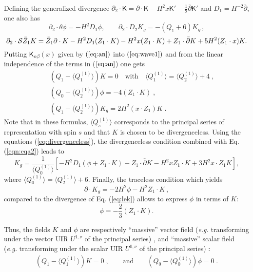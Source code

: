 \documentclass[a4paper,11pt,showpacs,preprintnumbers]{revtex4}
\def\K{\textsf{K}}
\begin{document}
Defining the generalized divergence $\partial_2\cdot \K=\partial
\cdot\K- H^2 x \K'-\frac{1}{2} \bar  \partial \K'$ and
$D_1=H^{-2}\bar \partial$, one also has
\begin{equation}
\partial_2 \cdot
\theta\phi=-H^2D_1\phi,\qquad\partial_2 \cdot D_2K_g =
-(Q_1+6)K_g\,,\nonumber
\end{equation}
\begin{equation}
\partial_2 \cdot {\cal S}\bar Z_1K=\bar Z_1
\partial \cdot K-H^2D_1(Z_{1}\cdot K)-H^2x(Z_{1}\cdot
K)+Z_{1}\cdot\bar\partial K+5H^2(Z_{1}\cdot x)
K.\label{eq:divergenceless}
\end{equation}
 Putting $\K_{\alpha\beta}(x)$ given by
$(\ref{eq:an})$ into $(\ref{eq:wave1})$ and from the linear
independence of the terms in ($\ref{eq:an}$) one gets
\begin{eqnarray}
&&\left(Q_{1}-\langle Q_1^{(1)}\rangle\right)K=0
\quad\mbox{with}\quad\langle Q_1^{(1)}\rangle= \langle Q_2^{(1)}\rangle+4\;,\label{eqn:eqa} \\
&&\left(Q_{0}-\langle Q_2^{(1)}\rangle \right)\phi =-4(Z_1 \cdot K)\;,\label{eqn:eqa1}\\
&&\left(Q_1 -\langle Q_2^{(1)}\rangle  \right)K_g=2H^2 (x \cdot
Z_1) K\label{eqn:eqa2}\;.
\end{eqnarray}
Note that in these formulas, $\langle Q_{s}^{(1)}\rangle$
corresponds to the principal series of representation with spin
$s$ and that $K$ is chosen to be divergenceless. Using the
equations  (\ref{eq:divergenceless}), the divergenceless condition
combined with Eq. (\ref{eqn:eqa2}) leads to
\begin{equation}\label{eq:lek}
K_g=\frac{1}{ \langle Q_{0}^{(1)}\rangle}
\left[-H^{2}D_{1}(\phi+Z_1\cdot K)+ Z_1\cdot\bar\partial
K-H^2xZ_1\cdot K+3H^2 x\cdot Z_1 K \right],
\end{equation}
where  $\langle Q_{0}^{(1)}\rangle=\langle Q_{2}^{(1)}\rangle+6$.
Finally, the traceless condition which yields
\begin{equation}
\bar{\partial}\cdot K_{g}=-2H^{2}\phi -H^{2}Z_1\cdot K\,,
\end{equation}
compared to the divergence of Eq. (\ref{eq:lek}) allows to express
$\phi$ in terms of $K$:
\begin{equation}
\phi=-\frac{2}{3}(Z_1\cdot K). \label{eq:phi}
\end{equation}

Thus, the fields $K$ and $\phi$ are respectively ``massive''
vector field ({\it e.g.} transforming under the vector UIR
$U^{1,\nu}$ of the principal series) \cite{gata}, and ``massive''
scalar field ({\it e.g.} transforming under the scalar UIR
$U^{0,\nu}$ of the principal series) \cite{brgamo}:
\begin{eqnarray}
\left(Q_{1}-\langle
Q_1^{(1)}\rangle\right)K=0\;,\qquad\mbox{and}\qquad
\left(Q_{0}-\langle Q_0^{(1)}\rangle \right)\phi =0\;.
\end{eqnarray}
\end{document}
